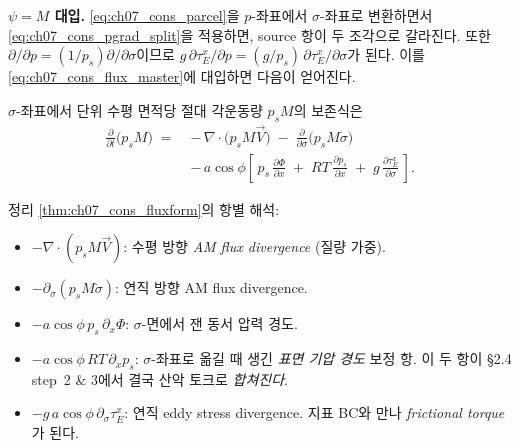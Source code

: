 
\medskip



\noindent\textbf{$\psi = M$ 대입.}
\eqref{eq:ch07_cons_parcel}을 $p$-좌표에서 $\sigma$-좌표로 변환하면서
\eqref{eq:ch07_cons_pgrad_split}을 적용하면, source 항이 두 조각으로 갈라진다.
또한 $\partial/\partial p = (1/p_s)\partial/\partial\sigma$이므로
$g\,\partial \tau_E^x/\partial p = (g/p_s)\,\partial \tau_E^x/\partial\sigma$가 된다.
이를 \eqref{eq:ch07_cons_flux_master}에 대입하면 다음이 얻어진다.

\begin{theorem}\label{thm:ch07_cons_fluxform}
$\sigma$-좌표에서 단위 수평 면적당 절대 각운동량 $p_s M$의 보존식은
\begin{equation}\label{eq:ch07_cons_fluxform}
  \boxed{\;
  \begin{aligned}
    \frac{\partial}{\partial t}\!\bigl(p_s M\bigr)
    \;=\;&
    -\,\nabla\!\cdot\!\bigl(p_s M \vec V\bigr)
    \;-\;
    \frac{\partial}{\partial\sigma}\!\bigl(p_s M\dot\sigma\bigr)
    \\[2pt]
    &-\,a\cos\phi\!\left[\,
        p_s\,\frac{\partial \Phi}{\partial x}
        \;+\;
        RT\,\frac{\partial p_s}{\partial x}
        \;+\;
        g\,\frac{\partial \tau_E^x}{\partial \sigma}
      \,\right].
  \end{aligned}
  \;}
\end{equation}
\end{theorem}

\begin{hisublock}
정리 \ref{thm:ch07_cons_fluxform}의 항별 해석:
\begin{itemize}
  \item $-\nabla\!\cdot\!(p_s M\vec V)$: 수평 방향 \emph{AM flux divergence}
        (질량 가중).
  \item $-\partial_\sigma(p_s M\dot\sigma)$: 연직 방향 AM flux divergence.
  \item $-a\cos\phi\, p_s\,\partial_x\Phi$: $\sigma$-면에서 잰 동서 압력 경도.
  \item $-a\cos\phi\, RT\,\partial_x p_s$: $\sigma$-좌표로 옮길 때 생긴
        \emph{표면 기압 경도} 보정 항.  이 두 항이 \S2.4 step~2 \& 3에서
        결국 산악 토크로 \emph{합쳐진다}.
  \item $-g\,a\cos\phi\,\partial_\sigma \tau_E^x$: 연직 eddy stress
        divergence.  지표 BC와 만나 \emph{frictional torque}가 된다.
\end{itemize}
\end{hisublock}

